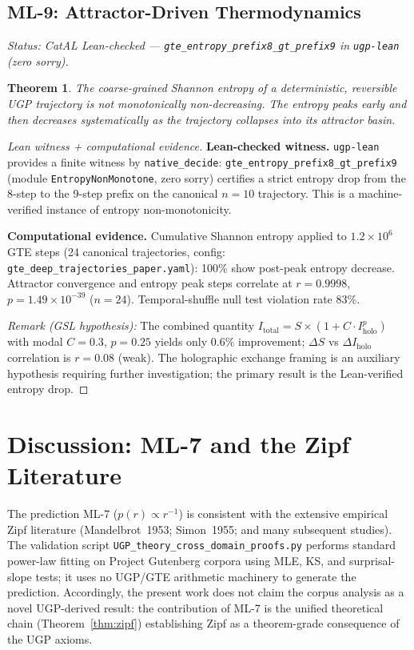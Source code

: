 \documentclass[11pt]{article}
\newtheorem{theorem}{Theorem}[section]
\begin{document}
\subsection{ML-9: Attractor-Driven Thermodynamics}
\emph{Status: CatAL Lean-checked — \texttt{gte\_entropy\_prefix8\_gt\_prefix9} in \texttt{ugp-lean}~\cite{ugp-lean} (zero sorry).}

\begin{theorem}
The coarse-grained Shannon entropy of a deterministic, reversible UGP trajectory is not monotonically non-decreasing. The entropy peaks early and then decreases systematically as the trajectory collapses into its attractor basin.
\end{theorem}
\begin{proof}[Lean witness + computational evidence]
\textbf{Lean-checked witness.} \texttt{ugp-lean}~\cite{SpivackUGPFormalization,ugp-lean} provides a finite witness by \texttt{native\_decide}: \texttt{gte\_entropy\_prefix8\_gt\_prefix9} (module \texttt{EntropyNonMonotone}, zero sorry) certifies a strict entropy drop from the 8-step to the 9-step prefix on the canonical $n{=}10$ trajectory. This is a machine-verified instance of entropy non-monotonicity.

\textbf{Computational evidence.} Cumulative Shannon entropy applied to $1.2\times 10^6$ GTE steps (24 canonical trajectories, config: \texttt{gte\_deep\_trajectories\_paper.yaml}): 100\% show post-peak entropy decrease. Attractor convergence and entropy peak steps correlate at $r = 0.9998$, $p = 1.49\times 10^{-39}$ ($n=24$). Temporal-shuffle null test violation rate 83\%.

\emph{Remark (GSL hypothesis):} The combined quantity $I_{\text{total}} = S\times(1+C\cdot I_{\text{holo}}^p)$ with modal $C=0.3$, $p=0.25$ yields only $0.6\%$ improvement; $\Delta S$ vs $\Delta I_{\text{holo}}$ correlation is $r=0.08$ (weak). The holographic exchange framing is an auxiliary hypothesis requiring further investigation; the primary result is the Lean-verified entropy drop.
\end{proof}

\section{Discussion: ML-7 and the Zipf Literature}
\label{sec:example}

The prediction ML-7 ($p(r) \propto r^{-1}$) is consistent with the extensive
empirical Zipf literature (Mandelbrot~1953; Simon~1955; and many subsequent
studies). The validation script \texttt{UGP\_theory\_cross\_domain\_proofs.py}
performs standard power-law fitting on Project Gutenberg corpora using
MLE, KS, and surprisal-slope tests; it uses no UGP/GTE arithmetic machinery
to generate the prediction. Accordingly, the present work does not claim the
corpus analysis as a novel UGP-derived result: the contribution of ML-7 is the
unified theoretical chain (Theorem~\ref{thm:zipf}) establishing Zipf as a
theorem-grade consequence of the UGP axioms.
\end{document}
